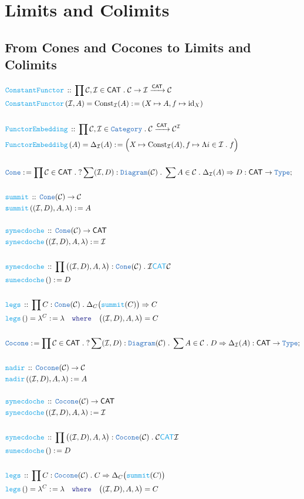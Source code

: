 \documentclass[12pt]{scrartcl}
\newcommand{\TYPE}[1]{\textcolor{NavyBlue}{\mathtt{#1}}}
\newcommand{\FUNC}[1]{\textcolor{Cerulean}{\mathtt{#1}}}
\newcommand{\LOGIC}[1]{\textcolor{Blue}{\mathtt{#1}}}
\renewcommand{\.}{\; . \;}
\newcommand{\de}{: \kern 0.1pc =}
\newcommand{\where}{\LOGIC{where}}
\newcommand{\Act}[1]{\left( #1 \right)}
\newcommand{\DeclareFunc}[2]{& \FUNC{#1} \, :: \, #2 \\}
\newcommand{\DefineFunc}[3]{&  \FUNC{#1}\Act{#2} \de #3 \\}
\newcommand{\DefineNamedFunc}[4]{&  \FUNC{#1}\Act{#2} = #3 \de #4 \\}
\newcommand{\Page}[1]{ \begin{align*} #1 \end{align*}   }
\newcommand{\Type}{\TYPE{Type}}
\DeclareMathOperator*{\id}{id}
\newcommand{\Cat}{\TYPE{Category}}
\newcommand{\Arrow}{\xrightarrow}
\newcommand{\Conclude}[3]{& #1 \de #2 : #3; \\}
\newcommand{\C}{\mathcal{C}}
\newcommand{\I}{\mathcal{I}}
\newcommand{\CAT}{\mathsf{CAT}}
\begin{document}
\section{Limits and Colimits}
\subsection{From Cones and Cocones to Limits and Colimits}
\Page{
	\DeclareFunc{ConstantFunctor}{ \prod \C,\I \in \CAT \. \C \to \I \Arrow{\CAT} \C}
	\DefineNamedFunc{ConstantFunctor}{\I,A}{ \mathrm{Const}_{\I}(A)}{ (X \mapsto A, f \mapsto {\id}_X)   } 
	\\
	\DeclareFunc{FunctorEmbedding}{\prod \C,\I \in \Cat \. \C \Arrow{\CAT} \C^\I}
	\DefineNamedFunc{FunctorEmbeddibg}{A}{ \Delta_{\I}(A)  }{
		\Big( X \mapsto \mathrm{Const}_{\I}(A), f \mapsto \Lambda i \in \I \. f \Big) }
	\\
	\Conclude{\TYPE{Cone}}{ \prod \C \in \CAT \. ?\sum  (\I, D) : \TYPE{Diagram}(\C) \. \sum A \in \C \. 
		 \Delta_{\I}(A) \Rightarrow D  }{ \CAT \to \Type}
	\\
	\DeclareFunc{summit}{\TYPE{Cone}(\C) \to  \C  }
	\DefineFunc{summit}{ (\I,D),A ,\lambda   }{A}
	\\
	\DeclareFunc{synecdoche}{\TYPE{Cone}(\C) \to \CAT}
	\DefineFunc{synecdoche}{(\I,D),A,\lambda}{\I}
	\\
	\DeclareFunc{synecdoche}{\prod \big((\I,D),A,\lambda\big) : \TYPE{Cone}(\C) \. \I \FUNC{\CAT} \C   }
	\DefineFunc{sunecdoche}{}{D}
	\\
	\DeclareFunc{legs}{\prod C : \TYPE{Cone}(\C) \. \Delta_C\big(\FUNC{summit}(C)\big) \Rightarrow C}
	\DefineNamedFunc{legs}{}{\lambda^C}{\lambda \quad \where \quad \big( (\I,D),A,\lambda \big) = C}
	\\
	\Conclude{\TYPE{Cocone}}{ \prod \C \in \CAT \. ?\sum  (\I, D) : \TYPE{Diagram}(\C) \. \sum A \in \C \. 
		 D \Rightarrow \Delta_{\I}(A)  }{ \CAT \to \Type}
	\\
	\DeclareFunc{nadir}{\TYPE{Cocone}(\C) \to  \C  }
	\DefineFunc{nadir}{ (\I,D),A ,\lambda   }{A}
	\\
	\DeclareFunc{synecdoche}{\TYPE{Cocone}(\C) \to \CAT}
	\DefineFunc{synecdoche}{(\I,D),A,\lambda}{\I}
	\\
	\DeclareFunc{synecdoche}{\prod \big((\I,D),A,\lambda\big) : \TYPE{Cocone}(\C) \. \C \FUNC{\CAT} \I   }
	\DefineFunc{sunecdoche}{}{D}
	\\
	\DeclareFunc{legs}{\prod C : \TYPE{Cocone}(\C) \. C \Rightarrow \Delta_C\big(\FUNC{summit}(C)\big) }
	\DefineNamedFunc{legs}{}{\lambda^C}{\lambda \quad \where \quad \big( (\I,D),A,\lambda \big) = C}
}
\end{document}
